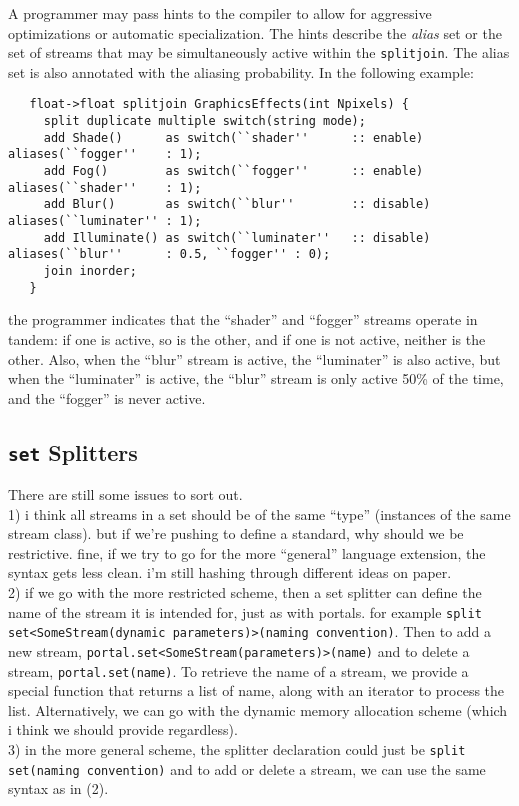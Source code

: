 \documentclass{tr}
\begin{document}
A programmer  may pass hints to  the compiler to  allow for aggressive
optimizations or automatic specialization. The hints describe the {\it
alias} set  or the  set of streams  that may be  simultaneously active
within the \verb+splitjoin+. The alias  set is also annotated with the
aliasing probability. In the following example:
\begin{verbatim}
   float->float splitjoin GraphicsEffects(int Npixels) {
     split duplicate multiple switch(string mode);
     add Shade()      as switch(``shader''      :: enable)  aliases(``fogger''    : 1);
     add Fog()        as switch(``fogger''      :: enable)  aliases(``shader''    : 1);
     add Blur()       as switch(``blur''        :: disable) aliases(``luminater'' : 1);
     add Illuminate() as switch(``luminater''   :: disable) aliases(``blur''      : 0.5, ``fogger'' : 0);
     join inorder;
   }
\end{verbatim}
the programmer  indicates that  the ``shader'' and  ``fogger'' streams
operate in tandem:  if one is active,  so is the other, and  if one is
not active,  neither is the other.  Also, when the  ``blur'' stream is
active, the  ``luminater'' is also active, but  when the ``luminater''
is active,  the ``blur'' stream is  only active 50\% of  the time, and
the ``fogger'' is never active.


\subsection {\texttt{set} Splitters}

There are still some issues to sort out.\\
1) i think all streams in a set should be of the same ``type''
(instances of the same stream class). but if we're pushing to define a
standard, why should we be restrictive. fine, if we try to go for the
more ``general'' language extension, the syntax gets less clean. i'm
still hashing through different ideas on paper.\\
2) if we go with the more restricted scheme, then a set splitter can
define the name of the stream it is intended for, just as with
portals. for example
\verb+split set<SomeStream(dynamic parameters)>(naming convention)+. Then to add a
new stream,
\verb+portal.set<SomeStream(parameters)>(name)+ and to delete a
stream,
\verb+portal.set(name)+. To retrieve the name of a stream, we provide
a special function that returns a list of name, along with an iterator
to process the list. Alternatively, we can go with the dynamic memory
allocation scheme (which i think we should provide regardless).\\
3) in the more general scheme, the splitter declaration could just be
\verb+split set(naming convention)+ and to add or delete a stream, we
can use the same syntax as in (2).
\end{document}
